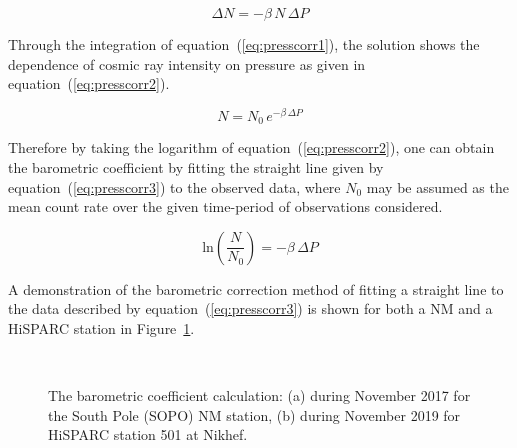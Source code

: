 \begin{equation}
\Delta N = - \beta \, N \, \Delta P
\label{eq:presscorr1}
\end{equation}

Through the integration of equation~(\ref{eq:presscorr1}), the solution shows the dependence of cosmic ray intensity on pressure as given in equation~(\ref{eq:presscorr2}). 

\begin{equation}
N = N_{0} \, e^{-\beta \, \Delta P}
\label{eq:presscorr2}
\end{equation}

Therefore by taking the logarithm of equation~(\ref{eq:presscorr2}), one can obtain the barometric coefficient by fitting the straight line given by equation~(\ref{eq:presscorr3}) to the observed data, where $N_0$ may be assumed as the mean count rate over the given time-period of observations considered.

\begin{equation}
\mathrm{ln} \left( \frac{N}{N_0} \right) = - \beta \, \Delta P
\label{eq:presscorr3}
\end{equation}

A demonstration of the barometric correction method of fitting a straight line to the data described by equation~(\ref{eq:presscorr3}) is shown for both a NM and a HiSPARC station in Figure~\ref{fig:barometric_fit}.

\begin{figure}[ht]
	\centering
	 \\
	
	\caption{The barometric coefficient calculation: (a) during November 2017 for the South Pole (SOPO) NM station, (b) during November 2019 for HiSPARC station 501 at Nikhef.}
	\label{fig:barometric_fit}
\end{figure}


